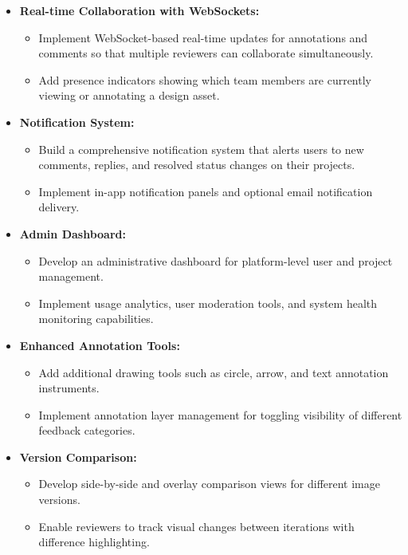 \documentclass[12pt,a4paper]{article}
\begin{document}
\begin{itemize}
    \item[\textbf{$\triangleright$}] \textbf{Real-time Collaboration with WebSockets:}
    \begin{itemize}
        \item Implement WebSocket-based real-time updates for annotations and comments so that multiple reviewers can collaborate simultaneously.
        \item Add presence indicators showing which team members are currently viewing or annotating a design asset.
    \end{itemize}

    \item[\textbf{$\triangleright$}] \textbf{Notification System:}
    \begin{itemize}
        \item Build a comprehensive notification system that alerts users to new comments, replies, and resolved status changes on their projects.
        \item Implement in-app notification panels and optional email notification delivery.
    \end{itemize}

    \item[\textbf{$\triangleright$}] \textbf{Admin Dashboard:}
    \begin{itemize}
        \item Develop an administrative dashboard for platform-level user and project management.
        \item Implement usage analytics, user moderation tools, and system health monitoring capabilities.
    \end{itemize}

    \item[\textbf{$\triangleright$}] \textbf{Enhanced Annotation Tools:}
    \begin{itemize}
        \item Add additional drawing tools such as circle, arrow, and text annotation instruments.
        \item Implement annotation layer management for toggling visibility of different feedback categories.
    \end{itemize}

    \item[\textbf{$\triangleright$}] \textbf{Version Comparison:}
    \begin{itemize}
        \item Develop side-by-side and overlay comparison views for different image versions.
        \item Enable reviewers to track visual changes between iterations with difference highlighting.
    \end{itemize}


\end{itemize}
\end{document}
